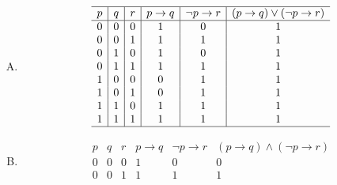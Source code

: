 {{\begin{practices}
\begin{enumerate}[A.]
{\begin{table}[H]
\[\begin{array}{c|c|c|c|c}
                                1 & 1 & 0 & 0 & 1 \\
                                1 & 1 & 1 & 1 & 1 \\
                                \hline
                            \end{array}
                        \]
                    \end{table}
                }
                \item
                {
                    \begin{table}[H]
                        \[
                            \begin{array}{c|c|c|c|c|c}
                                \hline
                                p & q & r & p \rightarrow q & \neg p \rightarrow r & (p \rightarrow q) \vee (\neg p \rightarrow r) \\
                                \hline
                                0 & 0 & 0 & 1 & 0 & 1 \\
                                0 & 0 & 1 & 1 & 1 & 1 \\
                                0 & 1 & 0 & 1 & 0 & 1 \\
                                0 & 1 & 1 & 1 & 1 & 1 \\
                                1 & 0 & 0 & 0 & 1 & 1 \\
                                1 & 0 & 1 & 0 & 1 & 1 \\
                                1 & 1 & 0 & 1 & 1 & 1 \\
                                1 & 1 & 1 & 1 & 1 & 1 \\
                                \hline
                            \end{array}
                        \]
                    \end{table}
                }
                \item
                {
                    \begin{table}[H]
                        \[
                            \begin{array}{c|c|c|c|c|c}
                                \hline
                                p & q & r & p \rightarrow q & \neg p \rightarrow r & (p \rightarrow q) \wedge (\neg p \rightarrow r) \\
                                \hline
                                0 & 0 & 0 & 1 & 0 & 0 \\
                                0 & 0 & 1 & 1 & 1 & 1 \\

\end{array}\]
\end{table}}
\end{enumerate}
\end{practices}}}
